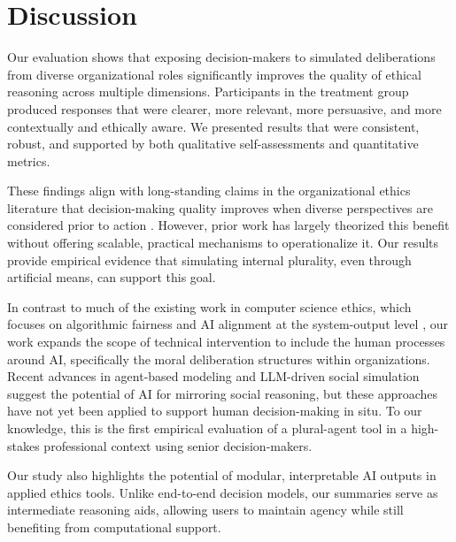 \section{Discussion}

\begin{comment}
    Here you discuss how your results are: (1) in-line with previous work; and (2) differ
    (expand) on previous work. Also, you can list the limitations of your work (link to future work)

    (a) Which results match previous findings in the literature?
    (b) Which results differ from previous findings, and why
\end{comment}

Our evaluation shows that exposing decision-makers to simulated deliberations from diverse organizational roles significantly improves the quality of ethical reasoning across multiple dimensions. Participants in the treatment group produced responses that were clearer, more relevant, more persuasive, and more contextually and ethically aware. We presented results that were consistent, robust, and supported by both qualitative self-assessments and quantitative metrics.

These findings align with long-standing claims in the organizational ethics literature that decision-making quality improves when diverse perspectives are considered prior to action \cite{donaldson_preston_1995, mitchell2020stakeholder}. However, prior work has largely theorized this benefit without offering scalable, practical mechanisms to operationalize it. Our results provide empirical evidence that simulating internal plurality, even through artificial means, can support this goal.

In contrast to much of the existing work in computer science ethics, which focuses on algorithmic fairness and AI alignment at the system-output level \cite{mehrabi2022survey, gabrielartificial}, our work expands the scope of technical intervention to include the human processes around AI, specifically the moral deliberation structures within organizations. Recent advances in agent-based modeling and LLM-driven social simulation \cite{park_etal_2024_1000, gilbert_2022} suggest the potential of AI for mirroring social reasoning, but these approaches have not yet been applied to support human decision-making in situ. To our knowledge, this is the first empirical evaluation of a plural-agent tool in a high-stakes professional context using senior decision-makers.

Our study also highlights the potential of modular, interpretable AI outputs in applied ethics tools. Unlike end-to-end decision models, our summaries serve as intermediate reasoning aids, allowing users to maintain agency while still benefiting from computational support.
